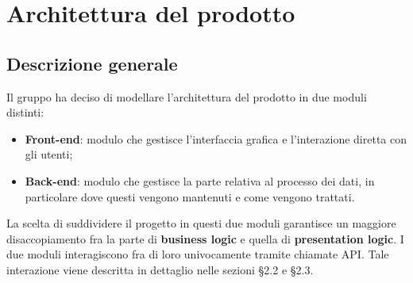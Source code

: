\section{Architettura del prodotto}

\subsection{Descrizione generale}

Il gruppo \Omicron{} ha deciso di modellare l'architettura del prodotto in due moduli distinti:
\begin{itemize}
\item \textbf{Front-end}: modulo che gestisce l'interfaccia grafica e l'interazione diretta con gli utenti;
\item \textbf{Back-end}: modulo che gestisce la parte relativa al processo dei dati, in particolare dove questi vengono mantenuti e come vengono trattati.
\end{itemize}

La scelta di suddividere il progetto in questi due moduli garantisce un maggiore disaccopiamento fra la parte di \textbf{business logic} e quella di \textbf{presentation logic}. I due moduli interagiscono fra di loro univocamente tramite chiamate API. Tale interazione viene descritta in dettaglio nelle sezioni \S{2.2} e \S{2.3}.



\newpage



